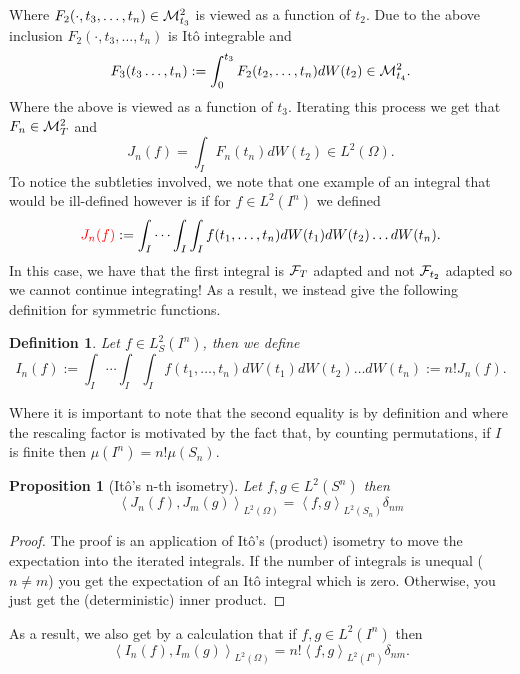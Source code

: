 \documentclass[13pt]{article}
\newtheorem{proposition}{Proposition}
\newtheorem{definition}{Definition}
\newcommand{\red}[1]{{\color{red}#1}}
\newcommand{\br}[1]{\left\langle#1\right\rangle}
\begin{document}
Where $F_2(\cdot,t_3,\ldots,t_n)\in \mathcal{M}_{t_3}^2$ is viewed as a function of $t_2$. Due to the above inclusion $F_2(\cdot,t_3,\ldots,t_n)$ is Itô integrable and
\begin{equation*}
	F_3(t_3\ldots,t_n):=	\int_{0}^{t_3} F_2(t_2,\ldots,t_n)dW(t_2) \in \mathcal{M}_{t_4}^2  .
\end{equation*}
Where the above is viewed as a function of $t_3$. Iterating this process we get that $F_n \in \mathcal{M}_T^2$ and
\begin{equation*}
	J_n(f)=\int_I F_n(t_n)dW(t_2) \in L^2(\Omega).
\end{equation*}
To notice the subtleties involved, we note that one example of an integral that would be ill-defined however is if for $f\in L^2(I^n)$
we defined
\begin{equation*}
	\red{J_n(f)}:=\int_I\cdots \int_I\int_I f(t_1,\ldots,t_n)dW(t_1) dW(t_2)\ldots dW(t_n).
\end{equation*}
In this case, we have that the first integral is $\mathcal{F}_T$ adapted and not $\mathcal{F}_{t_2}$ adapted so we cannot continue integrating! As a result, we instead give the following definition for symmetric functions.
\begin{definition}
	Let $f\in L^2_S(I^n)$, then we define
	\begin{equation*}
		I_n(f):=\int_I\cdots \int_I\int_I f(t_1,\ldots,t_n)dW(t_1) dW(t_2)\ldots dW(t_n):=n! J_n(f).
	\end{equation*}
\end{definition}
Where it is important to note that the second equality is by definition and where the rescaling factor is motivated by the fact that, by counting permutations, if $I$ is finite then $\mu(I^n)=n! \mu(S_n)$.
\begin{proposition}[Itô's n-th isometry]
	Let $f,g\in L^2(S^n)$ then
	\begin{equation*}
		\br{J_n(f),J_m(g)}_{L^2(\Omega)}=\br{f,g}_{L^2(S_n)}\delta_{nm}
	\end{equation*}
\end{proposition}
\begin{proof}
	The proof is an application of Itô's (product) isometry to move the expectation into the iterated integrals. If the number of integrals is unequal ($n\neq m$) you get the expectation of an Itô integral which is zero. Otherwise, you just get the (deterministic) inner product.
\end{proof}
As a result, we also get by a calculation that if $f,g\in L^2(I^n)$ then
\begin{equation*}
	\br{I_n(f),I_m(g)}_{L^2(\Omega)}=n!\br{f,g}_{L^2(I^n)}\delta_{nm}.
\end{equation*}
\end{document}
